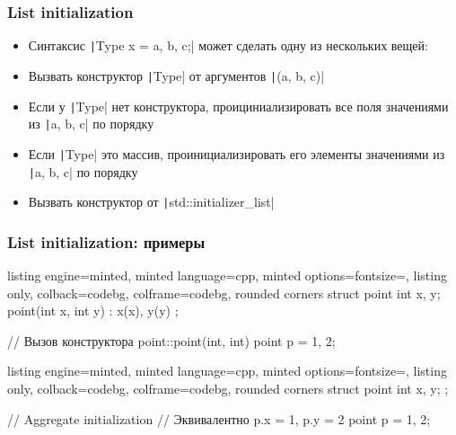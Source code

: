 \documentclass[10pt]{beamer}
\begin{document}
\begin{frame}[fragile]
\frametitle{List initialization}
\begin{itemize}
\item Синтаксис \texttt|Type x = {a, b, c};| может сделать одну из нескольких вещей:
\pause
\item Вызвать конструктор \texttt|Type| от аргументов \texttt|(a, b, c)|
\pause
\item Если у \texttt|Type| нет конструктора, проициниализировать все поля значениями из \texttt|{a, b, c}| по порядку
\pause
\item Если \texttt|Type| это массив, проинициализировать его элементы значениями из \texttt|{a, b, c}| по порядку
\pause
\item Вызвать конструктор от \texttt|std::initializer_list|
\end{itemize}
\end{frame}

\begin{frame}[fragile]
\frametitle{List initialization: примеры}
\begin{itemize}
\begin{tcblisting}{listing engine=minted, minted language=cpp, minted options={fontsize=\scriptsize}, listing only, colback=codebg, colframe=codebg, rounded corners}
struct point {
  int x, y;
  point(int x, int y)
    : x(x), y(y)
  {}
};

// Вызов конструктора point::point(int, int)
point p = {1, 2};
\end{tcblisting}
\pause
{}
\begin{tcblisting}{listing engine=minted, minted language=cpp, minted options={fontsize=\scriptsize}, listing only, colback=codebg, colframe=codebg, rounded corners}
struct point {
  int x, y;
};

// Aggregate initialization
// Эквивалентно p.x = 1, p.y = 2
point p = {1, 2};
\end{tcblisting}
\end{itemize}
\end{frame}
\end{document}
